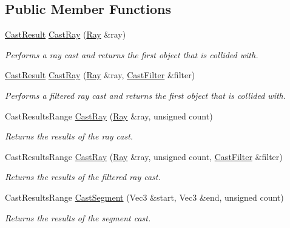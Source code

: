 \subsection*{Public Member Functions}
\begin{DoxyCompactItemize}
\item 
\hyperlink{structDCEngine_1_1CastResult}{Cast\-Result} \hyperlink{classDCEngine_1_1Components_1_1PhysicsSpace_a42e3b94c357b78e64b8af16227b146e1}{Cast\-Ray} (\hyperlink{structDCEngine_1_1Ray}{Ray} \&ray)
\begin{DoxyCompactList}\small\item\em Performs a ray cast and returns the first object that is collided with. \end{DoxyCompactList}\item 
\hyperlink{structDCEngine_1_1CastResult}{Cast\-Result} \hyperlink{classDCEngine_1_1Components_1_1PhysicsSpace_acec2ad99286f0db2cc310649bcc6c544}{Cast\-Ray} (\hyperlink{structDCEngine_1_1Ray}{Ray} \&ray, \hyperlink{structDCEngine_1_1CastFilter}{Cast\-Filter} \&filter)
\begin{DoxyCompactList}\small\item\em Performs a filtered ray cast and returns the first object that is collided with. \end{DoxyCompactList}\item 
Cast\-Results\-Range \hyperlink{classDCEngine_1_1Components_1_1PhysicsSpace_a1a297028d7d96a291cb6858c3436b836}{Cast\-Ray} (\hyperlink{structDCEngine_1_1Ray}{Ray} \&ray, unsigned count)
\begin{DoxyCompactList}\small\item\em Returns the results of the ray cast. \end{DoxyCompactList}\item 
Cast\-Results\-Range \hyperlink{classDCEngine_1_1Components_1_1PhysicsSpace_a4361d35f5b4246f0ba200b9b62a35e05}{Cast\-Ray} (\hyperlink{structDCEngine_1_1Ray}{Ray} \&ray, unsigned count, \hyperlink{structDCEngine_1_1CastFilter}{Cast\-Filter} \&filter)
\begin{DoxyCompactList}\small\item\em Returns the results of the filtered ray cast. \end{DoxyCompactList}\item 
Cast\-Results\-Range \hyperlink{classDCEngine_1_1Components_1_1PhysicsSpace_a05ba128f98610ecc986856909dc7c69e}{Cast\-Segment} (Vec3 \&start, Vec3 \&end, unsigned count)
\begin{DoxyCompactList}\small\item\em Returns the results of the segment cast. \end{DoxyCompactList}\item 

\end{DoxyCompactItemize}

